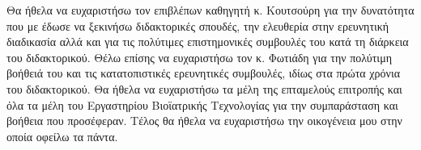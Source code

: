 \begin{acknowledgements}
	Θα ήθελα να ευχαριστήσω τον επιβλέπων καθηγητή κ. Κουτσούρη για την δυνατότητα που με έδωσε να ξεκινήσω διδακτορικές σπουδές, την ελευθερία στην ερευνητική διαδικασία αλλά και για τις πολύτιμες επιστημονικές συμβουλές του κατά τη διάρκεια του διδακτορικού.
	Θέλω επίσης να ευχαριστήσω τον κ. Φωτιάδη για την πολύτιμη βοήθειά του και τις κατατοπιστικές ερευνητικές συμβουλές, ιδίως στα πρώτα χρόνια του διδακτορικού.
	Θα ήθελα να ευχαριστήσω τα μέλη της επταμελούς επιτροπής και όλα τα μέλη του Εργαστηρίου Βιοϊατρικής Τεχνολογίας για την συμπαράσταση και βοήθεια που προσέφεραν.
	Τέλος θα ήθελα να ευχαριστήσω την οικογένεια μου στην οποία οφείλω τα πάντα.
\end{acknowledgements}
